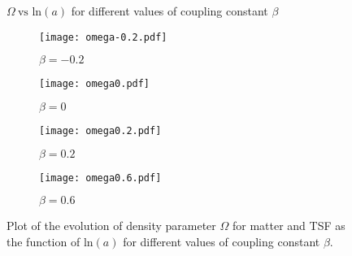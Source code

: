 \documentclass[preprint,aps,floatfix]{revtex4}
\begin{document}
        \begin{figure}[h]
            \centering
            $\Omega~\text{vs ln}(a)$ for different values of coupling constant $\beta$ \vspace{10pt}\\
            \begin{subfigure}{0.42\textwidth}
                \centering
                \texttt{[image: omega-0.2.pdf]}
                \caption{$\beta = -0.2$}
            \end{subfigure}
            \begin{subfigure}{0.57\textwidth}
                \centering
                \texttt{[image: omega0.pdf]}
                \caption{$\beta = 0$}
            \end{subfigure}
            \begin{subfigure}{0.42\textwidth}
                \centering
                \texttt{[image: omega0.2.pdf]}
                \caption{$\beta = 0.2$}
            \end{subfigure}
            \begin{subfigure}{0.57\textwidth}
                \centering
                \texttt{[image: omega0.6.pdf]}
                \caption{$\beta = 0.6$}
            \end{subfigure}
            \caption{Plot of the evolution of density parameter $\Omega$ for matter and TSF as the function of ln$(a)$ for different values of coupling constant $\beta$.}
            \label{fig: omega}
        \end{figure}


\end{document}
